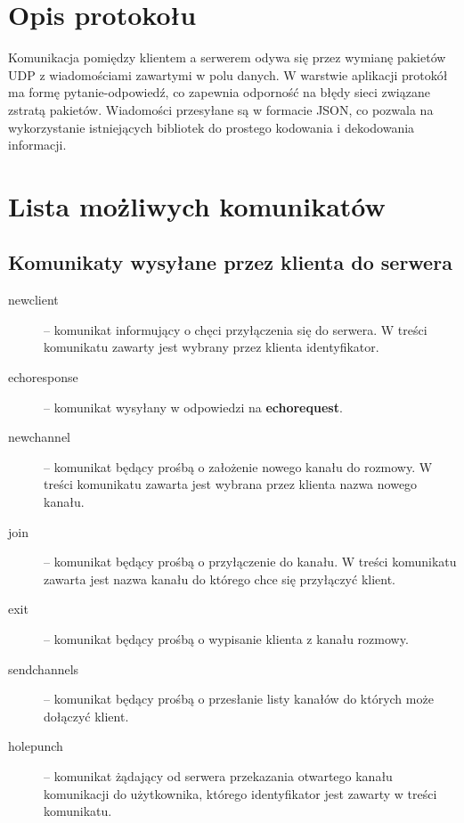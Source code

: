 \documentclass[a4paper, 10pt]{article}
\begin{document}
\tableofcontents

\newpage
\section{Opis protokołu}
Komunikacja pomiędzy klientem a serwerem odywa się przez wymianę pakietów UDP z wiadomościami zawartymi w polu danych. W warstwie aplikacji protokół ma formę pytanie-odpowiedź, co zapewnia odporność na błędy sieci związane zstratą pakietów. Wiadomości przesyłane są w formacie JSON, co pozwala na wykorzystanie istniejących bibliotek do prostego kodowania i dekodowania informacji.

\section{Lista możliwych komunikatów}
\subsection{Komunikaty wysyłane przez klienta do serwera}
\begin{description}
 \item[newclient] -- komunikat informujący o chęci przyłączenia się do serwera. W treści komunikatu zawarty jest wybrany przez klienta identyfikator.
 \item[echoresponse] -- komunikat wysyłany w odpowiedzi na \textbf{echorequest}.
 \item[newchannel] -- komunikat będący prośbą o założenie nowego kanału do rozmowy. W treści komunikatu zawarta jest wybrana przez klienta nazwa nowego kanału.
 \item[join] -- komunikat będący prośbą o przyłączenie do kanału. W treści komunikatu zawarta jest nazwa kanału do którego chce się przyłączyć klient.
 \item[exit] -- komunikat będący prośbą o wypisanie klienta z kanału rozmowy.
 \item[sendchannels] -- komunikat będący prośbą o przesłanie listy kanałów do których może dołączyć klient.
 \item[holepunch] -- komunikat żądający od serwera przekazania otwartego kanału komunikacji do użytkownika, którego identyfikator jest zawarty w treści komunikatu.
\end{description}
\end{document}
